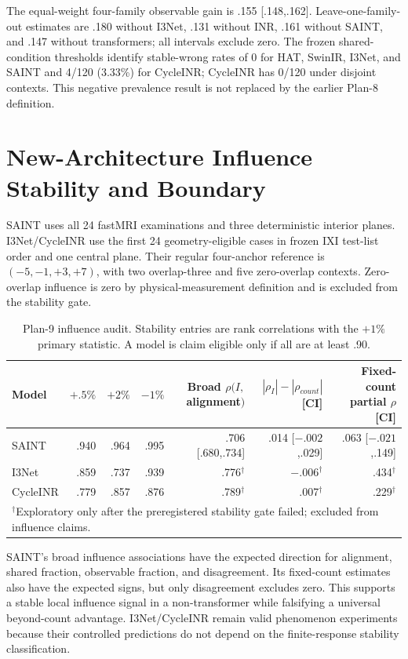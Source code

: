 \documentclass[10pt,twocolumn,letterpaper]{article}
\begin{document}
The equal-weight four-family observable gain is .155 [.148,.162]. Leave-one-family-out estimates are .180 without I3Net, .131 without INR, .161 without SAINT, and .147 without transformers; all intervals exclude zero. The frozen shared-condition thresholds identify stable-wrong rates of 0 for HAT, SwinIR, I3Net, and SAINT and 4/120 (3.33\%) for CycleINR; CycleINR has 0/120 under disjoint contexts. This negative prevalence result is not replaced by the earlier Plan-8 definition.

\section{New-Architecture Influence Stability and Boundary}
SAINT uses all 24 fastMRI examinations and three deterministic interior planes. I3Net/CycleINR use the first 24 geometry-eligible cases in frozen IXI test-list order and one central plane. Their regular four-anchor reference is $(-5,-1,+3,+7)$, with two overlap-three and five zero-overlap contexts. Zero-overlap influence is zero by physical-measurement definition and is excluded from the stability gate.

\begin{table}[t]
\centering
\caption{Plan-9 influence audit. Stability entries are rank correlations with the $+1\%$ primary statistic. A model is claim eligible only if all are at least .90.}
\label{tab:p9-influence}
\setlength{\tabcolsep}{4pt}
\begin{tabular}{lrrrrrr}
\toprule
Model & $+.5\%$ & $+2\%$ & $-1\%$ & Broad $\rho(I,$alignment$)$ & $|\rho_I|-|\rho_{count}|$ [CI] & Fixed-count partial $\rho$ [CI]\\
\midrule
SAINT & .940 & .964 & .995 & .706 [.680,.734] & .014 [$-.002$,.029] & .063 [$-.021$,.149]\\
I3Net & .859 & .737 & .939 & .776$^{\dagger}$ & $-.006^{\dagger}$ & .434$^{\dagger}$\\
CycleINR & .779 & .857 & .876 & .789$^{\dagger}$ & .007$^{\dagger}$ & .229$^{\dagger}$\\
\bottomrule
\multicolumn{7}{l}{$^{\dagger}$Exploratory only after the preregistered stability gate failed; excluded from influence claims.}
\end{tabular}
\end{table}

SAINT's broad influence associations have the expected direction for alignment, shared fraction, observable fraction, and disagreement. Its fixed-count estimates also have the expected signs, but only disagreement excludes zero. This supports a stable local influence signal in a non-transformer while falsifying a universal beyond-count advantage. I3Net/CycleINR remain valid phenomenon experiments because their controlled predictions do not depend on the finite-response stability classification.
\end{document}

